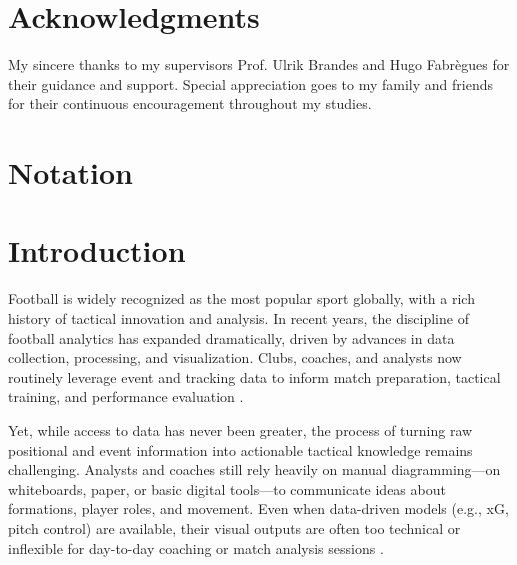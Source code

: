 \documentclass[11pt,a4paper,openright]{report}
\begin{document}
\chapter*{Acknowledgments}
My sincere thanks to my supervisors Prof. Ulrik Brandes and Hugo Fabrègues for their guidance and support. Special appreciation goes to my family and friends for their continuous encouragement throughout my studies.

\tableofcontents

\chapter*{Notation}


\chapter{Introduction}
Football is widely recognized as the most popular sport globally, with a rich history of tactical innovation and analysis. In recent years, the discipline of football analytics has expanded dramatically, driven by advances in data collection, processing, and visualization. Clubs, coaches, and analysts now routinely leverage event and tracking data to inform match preparation, tactical training, and performance evaluation \cite{sarmento2014match, perin2013soccerstories}. 

Yet, while access to data has never been greater, the process of turning raw positional and event information into actionable tactical knowledge remains challenging. Analysts and coaches still rely heavily on manual diagramming—on whiteboards, paper, or basic digital tools—to communicate ideas about formations, player roles, and movement. Even when data-driven models (e.g., xG, pitch control) are available, their visual outputs are often too technical or inflexible for day-to-day coaching or match analysis sessions \cite{sacha2014feature, perin2013soccerstories}.
\end{document}
